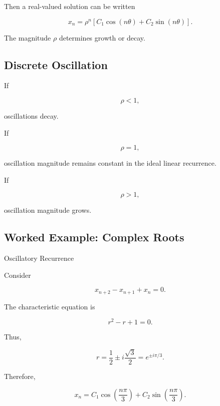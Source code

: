 Then a real-valued solution can be written

\[
\boxed{
x_n
=
\rho^n
\left[
C_1\cos(n\theta)
+
C_2\sin(n\theta)
\right].
}
\]

The magnitude \(\rho\) determines growth or decay.

\subsection{Discrete Oscillation}
\label{subsec:discrete-oscillation}

If

\[
\boxed{
\rho<1,
}
\]

oscillations decay.

If

\[
\boxed{
\rho=1,
}
\]

oscillation magnitude remains constant in the ideal linear recurrence.

If

\[
\boxed{
\rho>1,
}
\]

oscillation magnitude grows.

\subsection{Worked Example: Complex Roots}
\label{subsec:worked-difference-complex-roots}

\begin{workedexamplebox}{Oscillatory Recurrence}

Consider

\[
x_{n+2}
-
x_{n+1}
+
x_n
=
0.
\]

The characteristic equation is

\[
r^2-r+1=0.
\]

Thus,

\[
r
=
\frac12
\pm
i\frac{\sqrt3}{2}
=
e^{\pm i\pi/3}.
\]

Therefore,

\begin{answerbox}
\[
\boxed{
x_n
=
C_1\cos
\left(
\frac{n\pi}{3}
\right)
+
C_2\sin
\left(
\frac{n\pi}{3}
\right).
}
\]
\end{answerbox}

\end{workedexamplebox}

